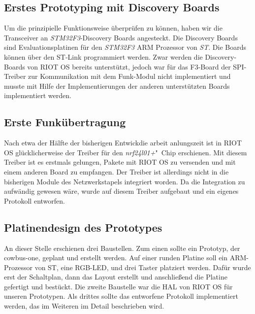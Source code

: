 \documentclass{IEEEtran}
\begin{document}
    \subsection{Erstes Prototyping mit Discovery Boards}
    Um die prinzipielle Funktionsweise überprüfen zu können, haben wir die 
    Transceiver an \emph{STM32F3}-Discovery Boards angesteckt. Die Discovery Boards 
    sind Evaluationsplatinen für den \emph{STM32F3} ARM Prozessor von \emph{ST}. Die Boards 
    können über den ST-Link programmiert werden.
    Zwar werden die Discovery-Boards von RIOT OS bereits unterstützt, jedoch war 
    für das F3-Board der SPI-Treiber zur Kommunikation mit dem Funk-Modul nicht 
    implementiert und musste mit Hilfe der Implementierungen der anderen 
    unterstützten Boards implementiert werden.

    \subsection{Erste Funkübertragung}
        Nach etwa der Hälfte der bisherigen Entwickdie arbeit anlungszeit ist in RIOT OS 
        glücklicherweise der Treiber für den \emph{nrf24l01+}"~Chip erschienen. Mit 
        diesem Treiber ist es erstmals gelungen, Pakete mit RIOT OS zu versenden 
        und mit einem anderen Board zu empfangen.
        Der Treiber ist allerdings nicht in die bisherigen Module des 
        Netzwerkstapels integriert worden. Da die Integration zu aufwändig 
        gewesen wäre, wurde auf diesem Treiber aufgebaut und ein eigenes 
        Protokoll entworfen.

    \subsection{Platinendesign des Prototypes}
    An dieser Stelle erschienen drei Baustellen. Zum einen sollte ein Prototyp, 
    der cowbus-one, geplant und erstellt werden. Auf einer runden Platine soll 
    ein ARM-Prozessor von ST, eine RGB-LED, und drei Taster platziert werden. 
    Dafür wurde erst der Schaltplan, dann das Layout erstellt und anschließend 
    die Platine gefertigt und bestückt.
    Die zweite Baustelle war die \ac{HAL} von RIOT OS 
    für unseren Prototypen. Als drittes sollte das entworfene Protokoll 
    implementiert werden, das im Weiteren im Detail beschrieben wird.

\end{document}
